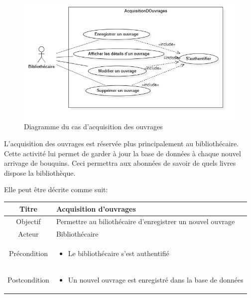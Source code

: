 \paragraph{} 
\begin{figure}[h]
        \centering
        \includegraphics[width=1\textwidth]{acquisitionDesOuvragesUseCase}
        \caption{Diagramme du cas d'acquisition des ouvrages}
        \label{image-acquisitionDesOuvragesUseCase}
        \end{figure}
\par
L'acquisition des ouvrages est réservée plus principalement au bibliothécaire. Cette activité lui permet de garder à jour
la base de données à chaque nouvel arrivage de bouquins. Ceci permettra aux abonnées de savoir de quels livres dispose
la bibliothèque.  \par 
Elle peut être décrite comme suit: \par 
\begin{tabular}{|c|p{7cm}|}
        \hline
        Titre & Acquisition d'ouvrages  \\
        \hline
        Objectif & Permettre au biliothécaire d'enregistrer un nouvel ouvrage \\
        \hline
        Acteur & Bibliothécaire \\
        \hline
        Précondition & \begin{itemize}
                \item Le bibliothécaire s'est authentifié 
        \end{itemize} \\
        \hline
        Postcondition & \begin{itemize}
                \item Un nouvel ouvrage est enregistré dans la base de données
        \end{itemize} \\
        \hline
\end{tabular}
